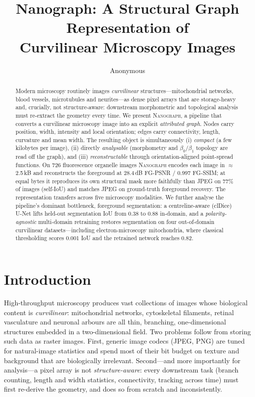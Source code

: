 \documentclass[runningheads]{llncs}
\title{Nanograph: A Structural Graph Representation of\\ Curvilinear Microscopy Images}
\author{Anonymous}
\institute{Anonymous Institution}
\newcommand{\method}{\textsc{Nanograph}\xspace}
\begin{document}
\maketitle

\begin{abstract}
Modern microscopy routinely images \emph{curvilinear} structures---mitochondrial
networks, blood vessels, microtubules and neurites---as dense pixel arrays that
are storage-heavy and, crucially, not structure-aware: downstream morphometric
and topological analysis must re-extract the geometry every time. We present
\method, a pipeline that converts a curvilinear microscopy image into an explicit
\emph{attributed graph}. Nodes carry position, width, intensity and local
orientation; edges carry connectivity, length, curvature and mean width. The
resulting object is simultaneously (i) \emph{compact} (a few kilobytes per
image), (ii) directly \emph{analysable} (morphometry and $\beta_0/\beta_1$
topology are read off the graph), and (iii) \emph{reconstructable} through
orientation-aligned point-spread functions. On 726 fluorescence organelle
images \method encodes each image in $\approx$\,2.5\,kB and reconstructs the
foreground at 28.4\,dB FG-PSNR / 0.997 FG-SSIM; at equal bytes it reproduces
its own structural mask more faithfully than JPEG on 77\% of images (self-IoU)
and matches JPEG on ground-truth foreground recovery. The representation
transfers across five microscopy modalities. We further analyse the pipeline's dominant bottleneck,
foreground segmentation: a centreline-aware (clDice) U-Net lifts held-out
segmentation IoU from 0.38 to 0.88 in-domain, and a \emph{polarity-agnostic}
multi-domain retraining restores segmentation on four out-of-domain curvilinear
datasets---including electron-microscopy mitochondria, where classical
thresholding scores 0.001 IoU and the retrained network reaches 0.82.
\end{abstract}

\section{Introduction}
High-throughput microscopy produces vast collections of images whose biological
content is \emph{curvilinear}: mitochondrial networks, cytoskeletal filaments,
retinal vasculature and neuronal arbours are all thin, branching, one-dimensional
structures embedded in a two-dimensional field. Two problems follow from storing
such data as raster images. First, generic image codecs (JPEG, PNG) are tuned for
natural-image statistics and spend most of their bit budget on texture and
background that are biologically irrelevant. Second---and more importantly for
analysis---a pixel array is not \emph{structure-aware}: every downstream task
(branch counting, length and width statistics, connectivity, tracking across
time) must first re-derive the geometry, and does so from scratch and
inconsistently.
\end{document}

